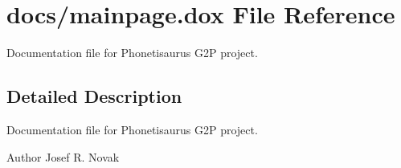 \hypertarget{mainpage_8dox}{}\section{docs/mainpage.dox File Reference}
\label{mainpage_8dox}


Documentation file for Phonetisaurus G2P project.  




\subsection{Detailed Description}
Documentation file for Phonetisaurus G2P project. 

\begin{DoxyAuthor}{Author}
Josef R. Novak 
\end{DoxyAuthor}
